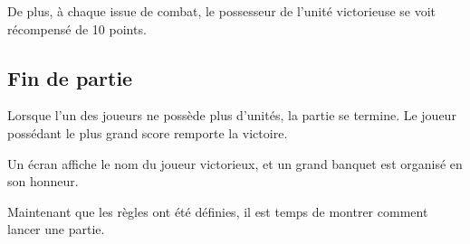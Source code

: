 		De plus, à chaque issue de combat, le possesseur de l'unité victorieuse se voit récompensé de 10 points.

	\subsection{Fin de partie}
		Lorsque l'un des joueurs ne possède plus d'unités, la partie se termine. Le joueur possédant le plus grand score remporte la victoire.

		Un écran affiche le nom du joueur victorieux, et un grand banquet est organisé en son honneur.

	Maintenant que les règles ont été définies, il est temps de montrer comment lancer une partie.
